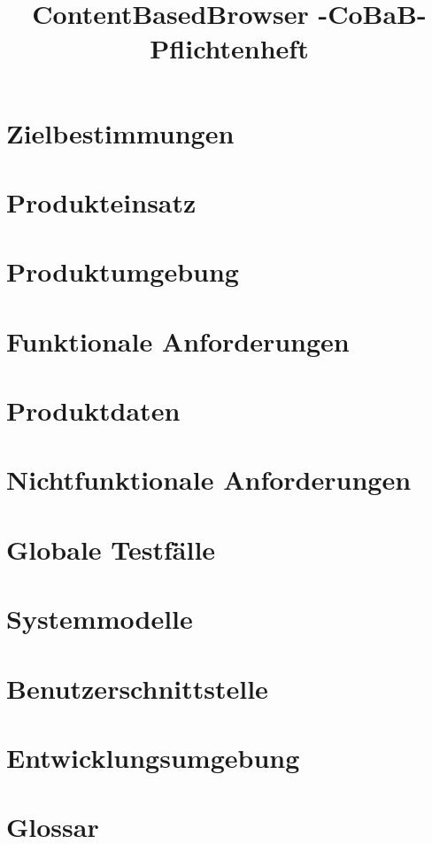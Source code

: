 \documentclass[parskip=full]{scrartcl}
\title{ContentBasedBrowser -CoBaB- \\ Pflichtenheft}
\begin{document}
\maketitle

\section{Zielbestimmungen}


\section{Produkteinsatz}


\section{Produktumgebung}


\section{Funktionale Anforderungen}


\section{Produktdaten}


\section{Nichtfunktionale Anforderungen}


\section{Globale Testf\"alle}


\section{Systemmodelle}


\section{Benutzerschnittstelle}


\section{Entwicklungsumgebung}


\section{Glossar}
\end{document}
